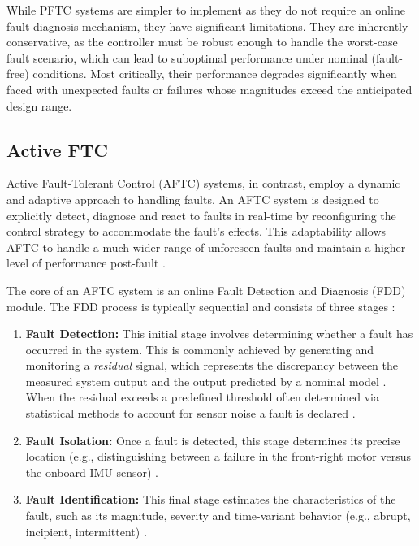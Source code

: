 While PFTC systems are simpler to implement as they do not require an online fault diagnosis mechanism, they have significant limitations. They are inherently conservative, as the controller must be robust enough to handle the worst-case fault scenario, which can lead to suboptimal performance under nominal (fault-free) conditions. Most critically, their performance degrades significantly when faced with unexpected faults or failures whose magnitudes exceed the anticipated design range.

\subsection{Active FTC}
Active Fault-Tolerant Control (AFTC) systems, in contrast, employ a dynamic and adaptive approach to handling faults. An AFTC system is designed to explicitly detect, diagnose and react to faults in real-time by reconfiguring the control strategy to accommodate the fault's effects. This adaptability allows AFTC to handle a much wider range of unforeseen faults and maintain a higher level of performance post-fault  \cite{active1,active2,active3}.

The core of an AFTC system is an online Fault Detection and Diagnosis (FDD) module. The FDD process is typically sequential and consists of three stages  \cite{fdd1,fdd2}:

\begin{enumerate}
    \item \textbf{Fault Detection:} This initial stage involves determining whether a fault has occurred in the system. This is commonly achieved by generating and monitoring a \textit{residual} signal, which represents the discrepancy between the measured system output and the output predicted by a nominal model  \cite{Isermann2011, ftc_UAV_review2}. When the residual exceeds a predefined threshold often determined via statistical methods to account for sensor noise a fault is declared  \cite{active1}.
    
    \item \textbf{Fault Isolation:} Once a fault is detected, this stage determines its precise location (e.g., distinguishing between a failure in the front-right motor versus the onboard IMU sensor)  \cite{Scognamiglio2024}.
    
    \item \textbf{Fault Identification:} This final stage estimates the characteristics of the fault, such as its magnitude, severity and time-variant behavior (e.g., abrupt, incipient, intermittent)  \cite{Zhang2008, Liu2022}.
\end{enumerate}

